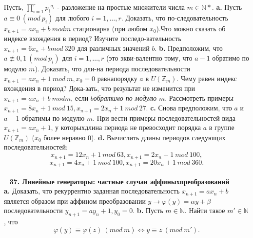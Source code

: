 \documentclass{mai_book}
\begin{document}
	Пусть, $\prod_{i=1}^r {p_i}^{a_i}$ - разложение на простые множители числа $m\in \mathbb{N*}$.\newline
\hspace*{15pt}\textbf{a.} Пусть $a\equiv 0\ (mod\ p_i)$ для любого $i=1,\ldots, r$. Доказать, что по-\newline следовательность $x_{n+1}=ax_n+b\ mod m$ стационарна (при любом $x_0$).\newline Что можно сказать об индексе вхождения в период? Изучите последо-\newline вательность $x_{n+1}=6x_n+b mod\ 320$ для различных значений $b$.\newline
\hspace*{15pt}\textbf{b.} Предположим, что $a\not\equiv 0, 1\ (mod\ p_i)$ для $i=1,\ldots, r$ (это экви-\newline валентно тому, что $a-1$ обратимо по модулю $m$). Доказать, что дли-\newline на периода последовательности $x_{n+1}=ax_n+1\ mod\ m, x_0=0$ равна\newline порядку $a$ в $U(\mathbb{Z}_m)$. Чему равен индекс вхождения в период? Дока-\newline зать, что результат не изменится при $x_{n+1}=ax_n+b\ mod m$, если $b$\newline \textit{обратимо по модулю} $m$. Рассмотреть примеры $x_{n+1}=8x_n+1\ mod\ 15,$\newline $x_{n+1}=2x_n+1\ mod\ 27$.\newline
\hspace*{15pt}\textbf{c.} Снова предположим, что $a$ и $a-1$ обратимы по модулю $m$. При-\newline вести примеры последовательностей вида $x_{n+1}=ax_n+1$, у которых\newline длина периода не превосходит порядка $a$ в группе $U(\mathbb{Z}_m)$ ($x_0$ более не\newline равно 0).\newline
\hspace*{15pt}\textbf{d.} Вычислить длины периодов следующих последовательностей:		
		$$
		x_{n+1}=12x_n+1\ mod\ 63, x_{n+1}=2x_n+1\ mod\ 100,
		$$
		$$
		x_{n+1}=4x_n+1\ mod\ 100, x_{n+1}=20x_n+1\ mod\ 360.
		$$\\
		\ \newline
\noindent\textbf{37. Линейные генераторы: частные случаи аффиных\newline преобразований}\\
	
\textbf{a.} Доказать, что рекуррентно заданная последовательность $x_{n+1}=$\newline $ax_n+b$ является образом при аффином преобразовании $y\rightarrow\varphi(y)=$\newline $\alpha y+\beta$ последовательности $y_{n+1}=ay_n+1, y_0=0$.\newline
\hspace*{15pt}\textbf{b.} Пусть $m\in \mathbb{N}$. Найти такое $m'\in \mathbb{N}$, что 
		$$
		\varphi(y)\equiv\varphi(z)\ (mod\ m)\Leftrightarrow y\equiv z\ (mod\ m').
		$$\newline
\end{document}
